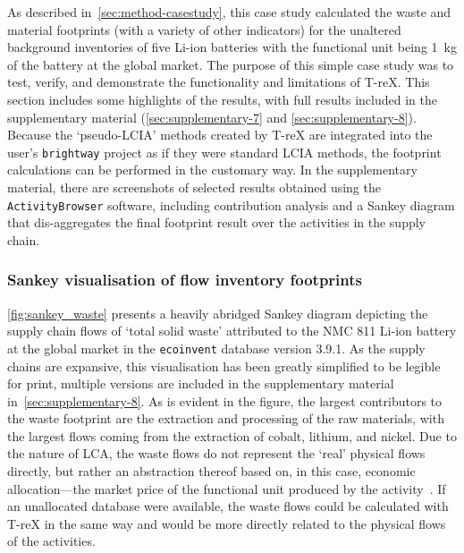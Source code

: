 \documentclass[a4paper,fleqn]{cas-dc}
\begin{document}
As described in~\autoref{sec:method-casestudy}, this case study calculated the
waste and material footprints (with a variety of other indicators) for the
unaltered background inventories of five Li-ion batteries with the functional
unit being 1~kg of the battery at the global market. The purpose of this simple
case study was to test, verify, and demonstrate the functionality and
limitations of T-reX. This section includes some highlights of the results,
with full results included in the supplementary material
(\autoref{sec:supplementary-7} and \autoref{sec:supplementary-8}). Because the `pseudo-LCIA' methods created by
T-reX are integrated into the user's \texttt{brightway} project as if they were
standard LCIA methods, the footprint calculations can be performed in the
customary way. In the supplementary material, there are screenshots of selected
results obtained using the \texttt{ActivityBrowser} software, including
contribution analysis and a Sankey diagram that dis-aggregates the final
footprint result over the activities in the supply chain.

\subsubsection{Sankey visualisation of flow inventory footprints}\label{sec:results-case_study-sankey}

\autoref{fig:sankey_waste} presents a heavily abridged Sankey diagram depicting the supply chain flows of `total solid waste' attributed to the NMC 811 Li-ion battery at the global market in the \texttt{ecoinvent} database version 3.9.1. As the supply chains are expansive, this visualisation has been greatly simplified to be legible for print, multiple versions are included in the supplementary material in~\autoref{sec:supplementary-8}. As is evident in the figure, the largest contributors to the waste footprint are the extraction and processing of the raw materials, with the largest flows coming from the extraction of cobalt, lithium, and nickel. Due to the nature of LCA, the waste flows do not represent the `real' physical flows directly, but rather an abstraction thereof based on, in this case, economic allocation---the market price of the functional unit produced by the activity~\citep{guinee2004economicallocation}. If an unallocated database were available, the waste flows could be calculated with T-reX in the same way and would be more directly related to the physical flows of the activities.
\end{document}
